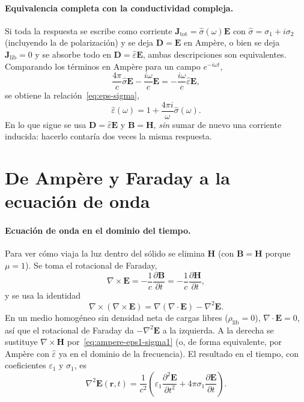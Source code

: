 \paragraph{Equivalencia completa con la conductividad compleja.}
Si toda la respuesta se escribe como corriente $\mathbf{J}_{\mathrm{tot}}=\hat\sigma(\omega)\mathbf{E}$
con $\hat\sigma=\sigma_1+i\sigma_2$ (incluyendo la de polarizaci\'on) y se deja $\mathbf{D}=\mathbf{E}$ en Amp\`ere,
o bien se deja $\mathbf{J}_{\mathrm{lib}}=0$ y se absorbe todo en $\mathbf{D}=\hat\varepsilon\mathbf{E}$,
ambas descripciones son equivalentes.
Comparando los t\'erminos en Amp\`ere para un campo $e^{-i\omega t}$,
\begin{equation}
\frac{4\pi}{c}\hat\sigma\mathbf{E}-\frac{i\omega}{c}\mathbf{E}
=-\frac{i\omega}{c}\hat\varepsilon\mathbf{E},
\end{equation}
se obtiene la relaci\'on~\eqref{eq:eps-sigma},
\begin{equation}
\hat\varepsilon(\omega)=1+\frac{4\pi i}{\omega}\hat\sigma(\omega).
\end{equation}
En lo que sigue se usa $\mathbf{D}=\hat\varepsilon\mathbf{E}$ y $\mathbf{B}=\mathbf{H}$,
\emph{sin} sumar de nuevo una corriente inducida: hacerlo contar\'ia dos veces la misma respuesta.

\section{De Amp\`ere y Faraday a la ecuaci\'on de onda}

\paragraph{Ecuaci\'on de onda en el dominio del tiempo.}
Para ver c\'omo viaja la luz dentro del s\'olido se elimina $\mathbf{H}$ (con $\mathbf{B}=\mathbf{H}$ porque $\mu=1$).
Se toma el rotacional de Faraday,
\begin{equation}
\nabla\times\mathbf{E}=-\frac{1}{c}\frac{\partial\mathbf{B}}{\partial t}
=-\frac{1}{c}\frac{\partial\mathbf{H}}{\partial t},
\end{equation}
y se usa la identidad
\begin{equation}
\nabla\times(\nabla\times\mathbf{E})=\nabla(\nabla\cdot\mathbf{E})-\nabla^{2}\mathbf{E}.
\end{equation}
En un medio homog\'eneo sin densidad neta de cargas libres ($\rho_{\mathrm{lib}}=0$), $\nabla\cdot\mathbf{E}=0$,
as\'i que el rotacional de Faraday da $-\nabla^{2}\mathbf{E}$ a la izquierda.
A la derecha se sustituye $\nabla\times\mathbf{H}$ por~\eqref{eq:ampere-eps1-sigma1}
(o, de forma equivalente, por Amp\`ere con $\hat\varepsilon$ ya en el dominio de la frecuencia).
El resultado en el tiempo, con coeficientes $\varepsilon_1$ y $\sigma_1$, es
\begin{equation}
\label{eq:onda-tiempo}
\nabla^{2}\mathbf{E}(\mathbf{r},t)
=\frac{1}{c^{2}}
\left(
\varepsilon_1\frac{\partial^{2}\mathbf{E}}{\partial t^{2}}
+4\pi\sigma_1\frac{\partial\mathbf{E}}{\partial t}
\right).
\end{equation}

